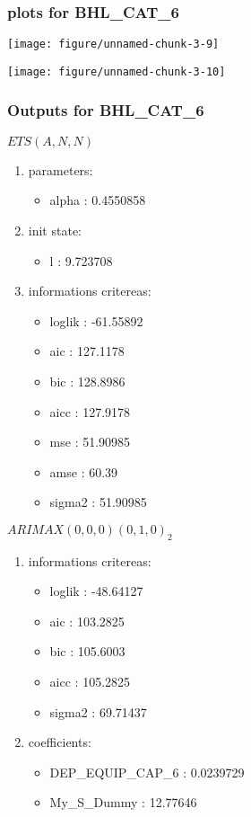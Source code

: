 \documentclass[10pt,a4paper]{article}\usepackage[]{graphicx}\usepackage[]{color}
\makeatletter
\def\maxwidth{ %
  \ifdim\Gin@nat@width>\linewidth
    \linewidth
  \else
    \Gin@nat@width
  \fi
}
\newcommand{\AaA}{\_}
\makeatother
\begin{document}
\subsubsection{plots for BHL\AaA CAT\AaA 6}

\texttt{[image: figure/unnamed-chunk-3-9]} 

\newpage

\texttt{[image: figure/unnamed-chunk-3-10]} 

\newpage
\subsubsection{Outputs for BHL\AaA CAT\AaA 6}
\begin{multicols}{2}


$ ETS(A,N,N) $
\begin{enumerate}
\item parameters:
\begin{itemize}
\item  alpha :  0.4550858 
\end{itemize}
\item init state:
\begin{itemize}
\item  l :  9.723708 
\end{itemize}
\item informations critereas:
\begin{itemize}
\item  loglik :  -61.55892 
\item  aic :  127.1178 
\item  bic :  128.8986 
\item  aicc :  127.9178 
\item  mse :  51.90985 
\item  amse :  60.39 
\item  sigma2 :  51.90985 
\end{itemize}
\end{enumerate}

\columnbreak


 $ARIMAX(0,0,0)(0,1,0)_{2}$ 
\begin{enumerate}
\item informations critereas:
\begin{itemize}
\item  loglik :  -48.64127 
\item  aic :  103.2825 
\item  bic :  105.6003 
\item  aicc :  105.2825 
\item  sigma2 :  69.71437 
\end{itemize}

\item coefficients:
\begin{itemize}
\item  DEP\AaA EQUIP\AaA CAP\AaA 6 :  0.0239729 
\item  My_S_Dummy :  12.77646 
\end{itemize}
\end{enumerate}
\end{multicols}
\end{document}
